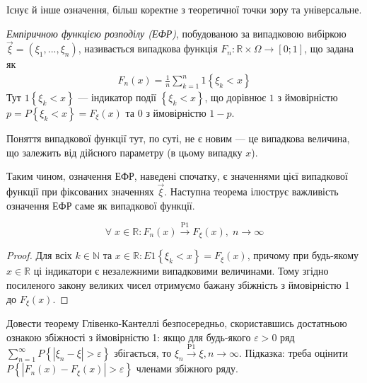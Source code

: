 Існує й інше означення, більш коректне з теоретичної точки зору та універсальне.
\begin{definition}
    \emph{Емпіричною функцією розподілу (ЕФР)}, побудованою за випадковою вибіркою $\vec{\xi} = \left( \xi_1, ..., \xi_n\right)$, називається випадкова функція 
    $F_n : \mathbb{R}\times \Omega \to [0; 1]$, що задана як
    \begin{gather}
        F_n(x) = \frac{1}{n} \sum\limits_{k=1}^n 1{\left\{ \xi_k < x\right\}}
    \end{gather}
    Тут $1{\left\{ \xi_k < x\right\}}$ --- індикатор події $\left\{ \xi_k < x\right\}$, що дорівнює $1$ з ймовірністю $p = P\left\{ \xi_k < x\right\} = F_{\xi}(x)$ та
    $0$ з ймовірністю $1-p$.       
\end{definition}
\begin{remark}
    Поняття випадкової функції тут, по суті, не є новим --- це випадкова величина, що залежить від дійсного параметру (в цьому випадку $x$).
\end{remark}
Таким чином, означення ЕФР, наведені спочатку, є значеннями цієї випадкової функції при фіксованих значеннях $\vec{\xi}$.
Наступна теорема ілюструє важливість означення ЕФР саме як випадкової функції.
\begin{theorem*}
    $$
    \forall \; x\in\mathbb{R}: F_n (x) \overset{\mathrm{P1}}{\longrightarrow} F_{\xi}(x), \; n\to\infty
    $$
\end{theorem*}
\begin{proof}
    Для всіх $k \in \mathbb{N} \text{ та } x \in\mathbb{R} :  E1{\left\{ \xi_k < x\right\}} = F_{\xi}(x)$, причому при будь-якому $x \in \mathbb{R}$ ці індикатори
    є незалежними випадковими величинами. Тому згідно посиленого закону великих чисел отримуємо бажану збіжність з ймовірністю 1 до $F_{\xi}(x)$.
\end{proof}
\begin{exercise}
    Довести теорему Глівенко-Кантеллі безпосередньо, скориставшись достатньою ознакою збіжності з ймовірністю 1:
    якщо для будь-якого $\varepsilon >0$ ряд
    $\sum\limits_{n=1}^{\infty} P\left\{\left| \xi_n - \xi\right| > \varepsilon\right\}$ збігається, то 
    $\xi_n \overset{\mathrm{P1}}{\longrightarrow} \xi, n \to \infty$. Підказка: треба оцінити 
    $P\left\{\left|F_n (x) - F_{\xi}(x)\right| > \varepsilon\right\}$ членами збіжного ряду.
\end{exercise}

